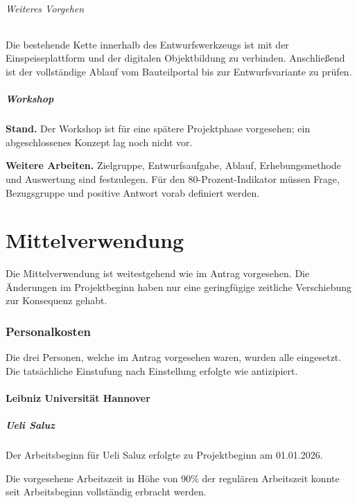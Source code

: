 \documentclass[type=zwischenbericht]{zukunftbau}
\begin{document}
\paragraph{Weiteres Vorgehen}
Die bestehende Kette innerhalb des Entwurfswerkzeugs ist mit der Einspeiseplattform und der digitalen Objektbildung zu verbinden. Anschließend ist der vollständige Ablauf vom Bauteilportal bis zur Entwurfsvariante zu prüfen.

\subsubsection{Workshop}

\textbf{Stand.} Der Workshop ist für eine spätere Projektphase vorgesehen; ein abgeschlossenes Konzept lag noch nicht vor.

\textbf{Weitere Arbeiten.} Zielgruppe, Entwurfsaufgabe, Ablauf, Erhebungsmethode und Auswertung sind festzulegen. Für den 80-Prozent-Indikator müssen Frage, Bezugsgruppe und positive Antwort vorab definiert werden.

\part{Mittelverwendung}

Die Mittelverwendung ist weitestgehend wie im Antrag vorgesehen. Die Änderungen im Projektbeginn haben nur eine geringfügige zeitliche Verschiebung zur Konsequenz gehabt.

\section{Personalkosten}

Die drei Personen, welche im Antrag vorgesehen waren, wurden alle eingesetzt. Die tatsächliche Einstufung nach Einstellung erfolgte wie antizipiert.

\subsection{Leibniz Universität Hannover}

\subsubsection{Ueli Saluz}
Der Arbeitsbeginn für Ueli Saluz erfolgte zu Projektbeginn am 01.01.2026.

Die vorgesehene Arbeitszeit in Höhe von 90\% der regulären Arbeitszeit konnte seit Arbeitsbeginn vollständig erbracht werden.
\end{document}
